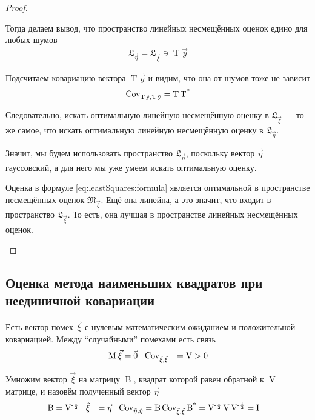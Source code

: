\begin{proof}
\begin{enumerate}
      Тогда делаем вывод, что пространство линейных несмещённых оценок
      едино для любых шумов
      \begin{align*}
          \mathfrak{L}_{\vec{\eta}}
          = \mathfrak{L}_{\vec{\xi}}
          \ni \operatorname{T} \vec{y}
      \end{align*}

      Подсчитаем ковариацию вектора $\operatorname{T} \vec{y}$ и видим,
      что она от шумов тоже не зависит
      \begin{align*}
          \operatorname{Cov^{}_{\operatorname{T} \vec{y}, \operatorname{T} \vec{y}}}
          = \operatorname{T} \operatorname{T^*}
      \end{align*}

      Следовательно, искать оптимальную линейную несмещённую оценку в
      $\mathfrak{L}_{\vec{\xi}}$ --- то же самое, что искать оптимальную
      линейную несмещённую оценку в $\mathfrak{L}_{\vec{\eta}}$.

      Значит, мы будем использовать пространство
      $\mathfrak{L}_{\vec{\eta}}$, поскольку вектор $\vec{\eta}$
      гауссовский, а для него мы уже умеем искать оптимальную оценку.

      Оценка в формуле \eqref{eq:leastSquares:formula} является
      оптимальной в пространстве несмещённых оценок
      $\mathfrak{M}_{\vec{\xi}}$. Ещё она линейна, а это значит, что
      входит в пространство $\mathfrak{L}_{\vec{\xi}}$.
      То есть, она лучшая в пространстве линейных несмещённых оценок.
  \end{enumerate}
\end{proof}
\subsection{Оценка метода наименьших квадратов при неединичной ковариации}

Есть вектор помех $\vec{\xi}$ с нулевым математическим ожиданием и положительной
ковариацией. Между ``случайными'' помехами есть связь
\begin{align*}
  \operatorname{M}_{} \vec{\xi} &= \vec{0} \ \
  \operatorname{Cov^{}_{\vec{\xi}, \vec{\xi}}} &= \operatorname{V} > 0
\end{align*}

Умножим вектор $\vec{\xi}$ на матрицу $\operatorname{B}$, квадрат которой равен
обратной к $\operatorname{V}$ матрице, и назовём полученный вектор $\vec{\eta}$
\begin{align*}
  \operatorname{B} &= \operatorname{V^{-\frac{1}{2}}} \ \
  \operatorname{\vec{\xi}} &= \vec{\eta} \ \
  \operatorname{Cov^{}_{\vec{\eta}, \vec{\eta}}} &= \operatorname{B} \operatorname{Cov^{}_{\vec{\xi}, \vec{\xi}}} \operatorname{B^*}
      = \operatorname{V^{-\frac{1}{2}}} \operatorname{V}
      \operatorname{V^{-\frac{1}{2}}} = \operatorname{I}
\end{align*}


